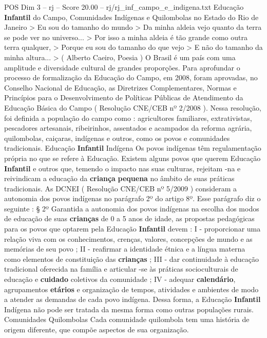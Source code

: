 \begin{textsample}{POS Dim 3 – rj – Score 20.00 – rj/rj\_inf\_campo\_e\_indigena.txt}  \label{ex:f3_pos_010}
Educação \textbf{Infantil} do Campo, Comunidades Indígenas e Quilombolas no Estado do Rio de Janeiro > Eu sou do tamanho do mundo > Da minha aldeia vejo quanto da terra se pode ver no universo... > Por isso a minha aldeia é tão grande como outra terra qualquer, > Porque eu sou do tamanho do que vejo > E não do tamanho da minha altura... > ( Alberto Caeiro, Poesia ) O Brasil é um país com uma amplitude e diversidade cultural de grandes proporções.
Para aprofundar o processo de formalização da Educação do Campo, em 2008, foram aprovadas, no Conselho Nacional de Educação, as Diretrizes Complementares, Normas e Princípios para o Desenvolvimento de Políticas Públicas de Atendimento da Educação Básica do Campo ( Resolução CNE/CEB nº 2/2008 ).
Nessa resolução, foi definida a população do campo como : agricultores familiares, extrativistas, pescadores artesanais, ribeirinhos, assentados e acampados da reforma agrária, quilombolas, caiçaras, indígenas e outros, como os povos e comunidades tradicionais.
Educação \textbf{Infantil} Indígena Os povos indígenas têm regulamentação própria no que se refere à Educação.
Existem alguns povos que querem Educação \textbf{Infantil} e outros que, temendo o impacto nas suas culturas, rejeitam -na e reivindicam a educação da \textbf{criança} \textbf{pequena} no âmbito de suas práticas tradicionais.
As DCNEI ( Resolução CNE/CEB nº 5/2009 ) consideram a autonomia dos povos indígenas no parágrafo 2º do artigo 8º.
Esse parágrafo diz o seguinte : § 2º Garantida a autonomia dos povos indígenas na escolha dos modos de educação de suas \textbf{crianças} de 0 a 5 anos de idade, as propostas pedagógicas para os povos que optarem pela Educação \textbf{Infantil} devem : I - proporcionar uma relação viva com os conhecimentos, crenças, valores, concepções de mundo e as memórias de seu povo ; II - reafirmar a identidade étnica e a língua materna como elementos de constituição das \textbf{crianças} ; III - dar continuidade à educação tradicional oferecida na família e articular -se às práticas socioculturais de educação e \textbf{cuidado} coletivos da comunidade ; IV - adequar \textbf{calendário}, agrupamentos \textbf{etários} e organização de tempos, atividades e ambientes de modo a atender as demandas de cada povo indígena.
Dessa forma, a Educação \textbf{Infantil} Indígena não pode ser tratada da mesma forma como outras populações rurais.
Comunidades Quilombolas Cada comunidade quilombola tem uma história de origem diferente, que compõe aspectos de sua organização.

\end{textsample}
